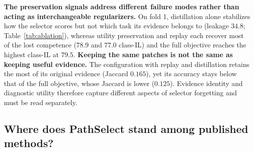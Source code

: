 \documentclass{article}
\begin{document}
\begin{table}[!htb]
\centering\footnotesize\renewcommand{\arraystretch}{0.92}
\setlength{\tabcolsep}{2.2pt}
\caption{\textbf{Preservation components and what each retains} (single-level selector, fold 1, 5-seed means, reverse order). $\Delta U$ is the per-slide change in equal-weight evidence utility on old-task slides, with the initial and final evidence sets both scored under the final eight-class head.}
\label{tab:ablation}
\end{table}

\textbf{The preservation signals address different failure modes rather than acting as interchangeable regularizers.} On fold 1, distillation alone stabilizes how the selector scores but not which task its evidence belongs to (leakage $34.8$; Table~\ref{tab:ablation}), whereas utility preservation and replay each recover most of the lost competence ($78.9$ and $77.0$ class-IL) and the full objective reaches the highest class-IL at $79.5$. \textbf{Keeping the same patches is not the same as keeping useful evidence.} The configuration with replay and distillation retains the most of its original evidence (Jaccard $0.165$), yet its accuracy stays below that of the full objective, whose Jaccard is lower ($0.125$). Evidence identity and diagnostic utility therefore capture different aspects of selector forgetting and must be read separately.

\subsection{Where does PathSelect stand among published methods?}
\label{ssec:sota}
\end{document}
